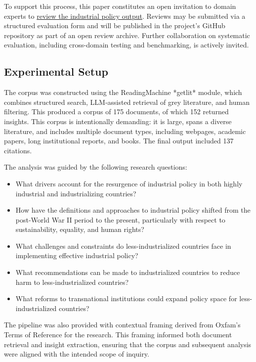 \documentclass[
  11pt,
]{article}
\providecommand{\tightlist}{%
  \setlength{\itemsep}{0pt}\setlength{\parskip}{0pt}}
\begin{document}
To support this process, this paper constitutes an open invitation to
domain experts to
\href{https://github.com/morrisseyj/ReadingMachine/blob/main/evaluation/EVAL_INSTRUCTIONS.md}{review
the industrial policy output}. Reviews may be submitted via a structured
evaluation form and will be published in the project's GitHub repository
as part of an open review archive. Further collaboration on systematic
evaluation, including cross-domain testing and benchmarking, is actively
invited.

\subsection{Experimental Setup}\label{experimental-setup}

The corpus was constructed using the ReadingMachine *getlit* module, 
which combines structured search, LLM-assisted retrieval of grey literature, 
and human filtering. This produced a corpus of 175 documents, of which 152 
returned insights. This corpus is intentionally demanding: it is large, spans 
a diverse literature, and includes multiple document types, including webpages, 
academic papers, long institutional reports, and books. The final output included 
137 citations.

The analysis was guided by the following research questions:

\begin{itemize}
\tightlist
\item
  What drivers account for the resurgence of industrial policy in both
  highly industrial and industrializing countries?
\item
  How have the definitions and approaches to industrial policy shifted
  from the post-World War II period to the present, particularly with
  respect to sustainability, equality, and human rights?
\item
  What challenges and constraints do less-industrialized countries face
  in implementing effective industrial policy?
\item
  What recommendations can be made to industrialized countries to reduce
  harm to less-industrialized countries?
\item
  What reforms to transnational institutions could expand policy space
  for less-industrialized countries?
\end{itemize}

The pipeline was also provided with contextual framing derived from
Oxfam's Terms of Reference for the research. This framing informed both
document retrieval and insight extraction, ensuring that the corpus and
subsequent analysis were aligned with the intended scope of inquiry.
\end{document}
